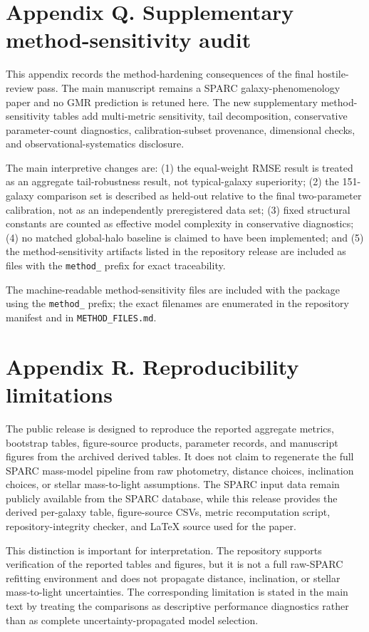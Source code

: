 \documentclass[twocolumn,linenumbers]{aastex701}
\begin{document}
\section{Appendix Q. Supplementary method-sensitivity audit}

This appendix records the method-hardening consequences of the final hostile-review pass. The main manuscript remains a SPARC galaxy-phenomenology paper and no GMR prediction is retuned here. The new supplementary method-sensitivity tables add multi-metric sensitivity, tail decomposition, conservative parameter-count diagnostics, calibration-subset provenance, dimensional checks, and observational-systematics disclosure.

The main interpretive changes are: (1) the equal-weight RMSE result is treated as an aggregate tail-robustness result, not typical-galaxy superiority; (2) the 151-galaxy comparison set is described as held-out relative to the final two-parameter calibration, not as an independently preregistered data set; (3) fixed structural constants are counted as effective model complexity in conservative diagnostics; (4) no matched global-halo baseline is claimed to have been implemented; and (5) the method-sensitivity artifacts listed in the repository release are included as files with the \texttt{method\_} prefix for exact traceability.

The machine-readable method-sensitivity files are included with the package using the \texttt{method\_} prefix; the exact filenames are enumerated in the repository manifest and in \texttt{METHOD\_FILES.md}.

\section{Appendix R. Reproducibility limitations}

The public release is designed to reproduce the reported aggregate metrics, bootstrap tables, figure-source products, parameter records, and manuscript figures from the archived derived tables. It does not claim to regenerate the full SPARC mass-model pipeline from raw photometry, distance choices, inclination choices, or stellar mass-to-light assumptions. The SPARC input data remain publicly available from the SPARC database, while this release provides the derived per-galaxy table, figure-source CSVs, metric recomputation script, repository-integrity checker, and LaTeX source used for the paper.

This distinction is important for interpretation. The repository supports verification of the reported tables and figures, but it is not a full raw-SPARC refitting environment and does not propagate distance, inclination, or stellar mass-to-light uncertainties. The corresponding limitation is stated in the main text by treating the comparisons as descriptive performance diagnostics rather than as complete uncertainty-propagated model selection.
\end{document}
